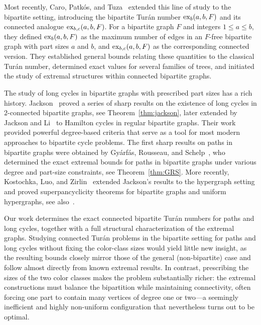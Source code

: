 \documentclass[11pt,a4paper]{article}
\newcommand{\ex}{{\rm ex}}
\begin{document}
Most recently, Caro, Patkós, and Tuza~\cite{caro2025bipartite} extended this line of study to the bipartite setting, introducing the bipartite Turán number $\ex_b(a,b, F)$ and its connected analogue $\ex_{b,c}(a,b, F)$.
For a bipartite graph $F$ and integers $1 \le a \le b$, they defined $\ex_b(a,b,F)$ as the maximum number of edges in an $F$-free bipartite graph with part sizes $a$ and $b$, and $\ex_{b,c}(a,b,F)$ as the corresponding connected version. 
They established general bounds relating these quantities to the classical Turán number, determined exact values for several families of trees, and initiated the study of extremal structures within connected bipartite graphs.

The study of long cycles in bipartite graphs with prescribed part sizes has a rich history.  
Jackson~\cite{jackson1981cycles,jackson1985long} proved a series of sharp results on the existence of long cycles in $2$-connected bipartite graphs, see Theorem~\ref{thm:jackson}, later extended by Jackson and Li~\cite{jackson1994hamilton} to Hamilton cycles in regular bipartite graphs.  
Their work provided powerful degree-based criteria that serve as a tool for most modern approaches to bipartite cycle problems.
The first sharp results on paths in bipartite graphs were obtained by Gyárfás, Rousseau, and Schelp~\cite{gyarfas1984extremal}, who determined the exact extremal bounds for paths in bipartite graphs under various degree and part-size constraints, see Theorem~\ref{thm:GRS}.  
More recently, Kostochka, Luo, and Zirlin~\cite{kostochka2020super} extended Jackson’s results to the hypergraph setting and proved superpancyclicity theorems for bipartite graphs and uniform hypergraphs, see also~\cite{kostochka2022longest}.

Our work determines the exact connected bipartite Turán numbers for paths and long cycles, together with a full structural characterization of the extremal graphs.
Studying connected Turán problems in the bipartite setting for paths and long cycles without fixing the color-class sizes would yield little new insight, as the resulting bounds closely mirror those of the general (non-bipartite) case and follow almost directly from known extremal results.
In contrast, prescribing the sizes of the two color classes makes the problem substantially richer: the extremal constructions must balance the bipartition while maintaining connectivity, often forcing one part to contain many vertices of degree one or two—a seemingly inefficient and highly non-uniform configuration that nevertheless turns out to be optimal.
\end{document}
